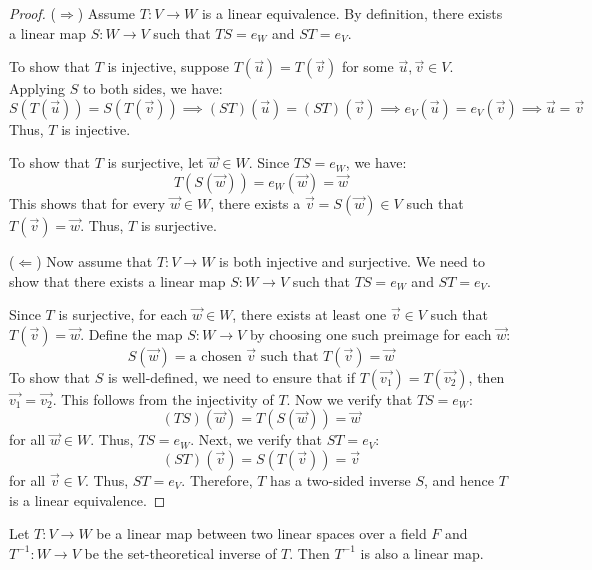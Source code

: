 \documentclass[
	11pt, %
	fleqn, %
	a4paper, %
]{LegrandOrangeBook}
\begin{document}
\begin{proof}
    (\(\Rightarrow\)) Assume \(T: V \to W\) is a linear equivalence. By definition, there exists a linear map \(S: W \to V\) such that \(TS = e_W\) and \(ST = e_V\).

    To show that \(T\) is injective, suppose \(T(\vec{u}) = T(\vec{v})\) for some \(\vec{u}, \vec{v} \in V\). Applying \(S\) to both sides, we have:
    \[
        S(T(\vec{u})) = S(T(\vec{v})) \implies (ST)(\vec{u}) = (ST)(\vec{v}) \implies e_V(\vec{u}) = e_V(\vec{v}) \implies \vec{u} = \vec{v}
    \]
    Thus, \(T\) is injective.

    To show that \(T\) is surjective, let \(\vec{w} \in W\). Since \(TS = e_W\), we have:
    \[
        T(S(\vec{w})) = e_W(\vec{w}) = \vec{w}
    \]
    This shows that for every \(\vec{w} \in W\), there exists a \(\vec{v} = S(\vec{w}) \in V\) such that \(T(\vec{v}) = \vec{w}\). Thus, \(T\) is surjective.

    (\(\Leftarrow\)) Now assume that \(T: V \to W\) is both injective and surjective. We need to show that there exists a linear map \(S: W \to V\) such that \(TS = e_W\) and \(ST = e_V\).

    Since \(T\) is surjective, for each \(\vec{w} \in W\), there exists at least one \(\vec{v} \in V\) such that \(T(\vec{v}) = \vec{w}\). Define the map \(S: W \to V\) by choosing one such preimage for each \(\vec{w}\):
    \[
        S(\vec{w}) = \text{a chosen } \vec{v} \text{ such that } T(\vec{v}) = \vec{w}
    \]
    To show that \(S\) is well-defined, we need to ensure that if \(T(\vec{v_1}) = T(\vec{v_2})\), then \(\vec{v_1} = \vec{v_2}\). This follows from the injectivity of \(T\).
    Now we verify that \(TS = e_W\):
    \[
        (TS)(\vec{w}) = T(S(\vec{w})) = \vec{w}
    \]
    for all \(\vec{w} \in W\). Thus, \(TS = e_W\).
    Next, we verify that \(ST = e_V\):
    \[
        (ST)(\vec{v}) = S(T(\vec{v})) = \vec{v}
    \]
    for all \(\vec{v} \in V\). Thus, \(ST = e_V\).
    Therefore, \(T\) has a two-sided inverse \(S\), and hence \(T\) is a linear equivalence.
\end{proof}

\begin{proposition}
    Let $T: V \to W$ be a linear map between two linear spaces over a field $F$ and $T^{-1}: W \to V$ be the set-theoretical inverse of $T$. Then $T^{-1}$ is also a linear map.
\end{proposition}
\end{document}
